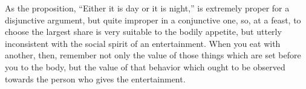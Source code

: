 As the proposition, ``Either it is day or it is night,'' is extremely
proper for a disjunctive argument, but quite improper in a conjunctive
one, so, at a feast, to choose the largest share is very suitable
to the bodily appetite, but utterly inconsistent with the social spirit
of an entertainment. When you eat with another, then, remember not
only the value of those things which are set before you to the body,
but the value of that behavior which ought to be observed towards
the person who gives the entertainment. 
